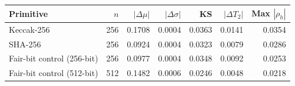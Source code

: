\begin{tabular}{lrrrrrr}
\hline
Primitive & $n$ & $|\Delta\mu|$ & $|\Delta\sigma|$ & KS & $|\Delta T_2|$ & Max $|\rho_h|$ \\
\hline
Keccak-256 & 256 & 0.1708 & 0.0004 & 0.0363 & 0.0141 & 0.0354 \\
SHA-256 & 256 & 0.0924 & 0.0004 & 0.0323 & 0.0079 & 0.0286 \\
Fair-bit control (256-bit) & 256 & 0.0977 & 0.0004 & 0.0348 & 0.0092 & 0.0253 \\
Fair-bit control (512-bit) & 512 & 0.1482 & 0.0006 & 0.0246 & 0.0048 & 0.0218 \\
\hline
\end{tabular}
